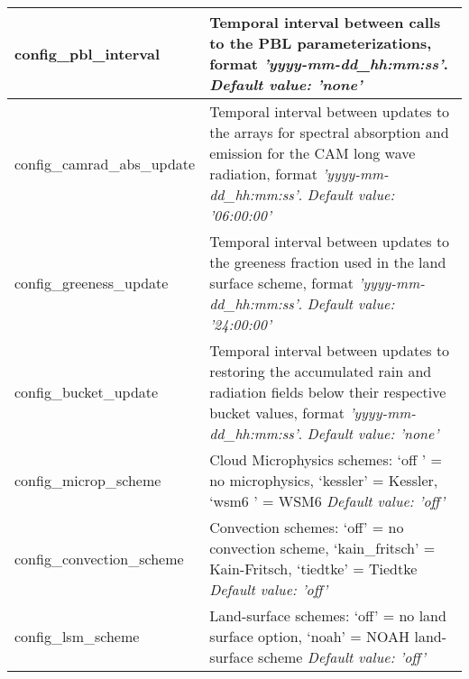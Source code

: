 {\begin{longtable}{|p{2.0in} |p{4.25in}|}
  config\_pbl\_interval & Temporal interval between calls to the PBL parameterizations, format {\em 'yyyy-mm-dd\_hh:mm:ss'}.  \newline 
  {\em Default value: 'none'} \\ \hline

  config\_camrad\_abs\_update & Temporal interval between updates to the arrays for spectral absorption and emission for the CAM long wave radiation, format {\em 'yyyy-mm-dd\_hh:mm:ss'}. \newline 
  {\em Default value: '06:00:00'} \\ \hline

  config\_greeness\_update & Temporal interval between updates to the greeness fraction used in the land surface scheme, format {\em 'yyyy-mm-dd\_hh:mm:ss'}. \newline 
  {\em Default value: '24:00:00'} \\ \hline      

  config\_bucket\_update & Temporal interval between updates to restoring the accumulated rain and radiation fields below their respective bucket values, format {\em 'yyyy-mm-dd\_hh:mm:ss'}. \newline 
  {\em Default value: 'none'} \\ \hline      

  config\_microp\_scheme & Cloud Microphysics schemes: \newline
                                             `off '  = no microphysics, \newline
                                             `kessler' = Kessler, \newline 
                                             `wsm6       ' = WSM6 \newline
  {\em Default value: 'off'} \\ \hline

  config\_convection\_scheme & Convection schemes: \newline
                                             `off' = no convection scheme, \newline
                                             `kain\_fritsch' = Kain-Fritsch, \newline 
                                             `tiedtke' = Tiedtke \newline
  {\em Default value: 'off'} \\ \hline

  config\_lsm\_scheme & Land-surface schemes: \newline
                                             `off' = no land surface option, \newline
                                             `noah' = NOAH land-surface scheme \newline                                              
  {\em Default value: 'off'} \\ \hline


\end{longtable}}
